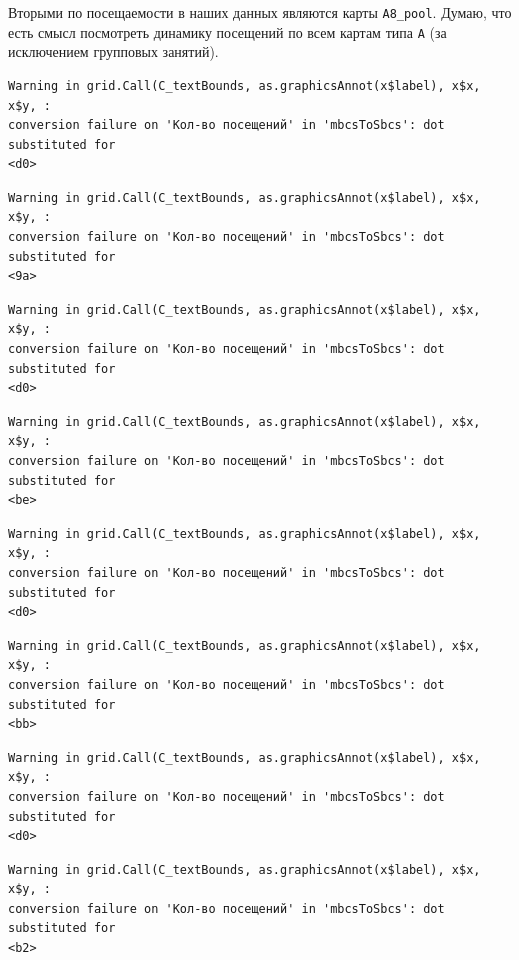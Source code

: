 \documentclass[
  letterpaper,
  DIV=11,
  numbers=noendperiod]{scrartcl}
\begin{document}
Вторыми по посещаемости в наших данных являются карты \texttt{А8\_pool}.
Думаю, что есть смысл посмотреть динамику посещений по всем картам типа
\texttt{А} (за исключением групповых занятий).

\begin{verbatim}
Warning in grid.Call(C_textBounds, as.graphicsAnnot(x$label), x$x, x$y, :
conversion failure on 'Кол-во посещений' in 'mbcsToSbcs': dot substituted for
<d0>
\end{verbatim}

\begin{verbatim}
Warning in grid.Call(C_textBounds, as.graphicsAnnot(x$label), x$x, x$y, :
conversion failure on 'Кол-во посещений' in 'mbcsToSbcs': dot substituted for
<9a>
\end{verbatim}

\begin{verbatim}
Warning in grid.Call(C_textBounds, as.graphicsAnnot(x$label), x$x, x$y, :
conversion failure on 'Кол-во посещений' in 'mbcsToSbcs': dot substituted for
<d0>
\end{verbatim}

\begin{verbatim}
Warning in grid.Call(C_textBounds, as.graphicsAnnot(x$label), x$x, x$y, :
conversion failure on 'Кол-во посещений' in 'mbcsToSbcs': dot substituted for
<be>
\end{verbatim}

\begin{verbatim}
Warning in grid.Call(C_textBounds, as.graphicsAnnot(x$label), x$x, x$y, :
conversion failure on 'Кол-во посещений' in 'mbcsToSbcs': dot substituted for
<d0>
\end{verbatim}

\begin{verbatim}
Warning in grid.Call(C_textBounds, as.graphicsAnnot(x$label), x$x, x$y, :
conversion failure on 'Кол-во посещений' in 'mbcsToSbcs': dot substituted for
<bb>
\end{verbatim}

\begin{verbatim}
Warning in grid.Call(C_textBounds, as.graphicsAnnot(x$label), x$x, x$y, :
conversion failure on 'Кол-во посещений' in 'mbcsToSbcs': dot substituted for
<d0>
\end{verbatim}

\begin{verbatim}
Warning in grid.Call(C_textBounds, as.graphicsAnnot(x$label), x$x, x$y, :
conversion failure on 'Кол-во посещений' in 'mbcsToSbcs': dot substituted for
<b2>
\end{verbatim}
\end{document}
